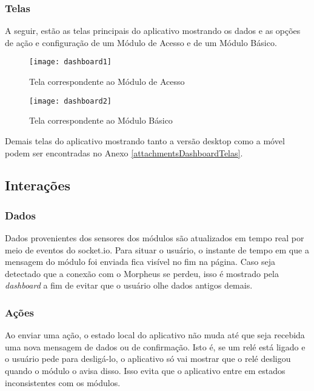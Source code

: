 \subsubsection{Telas}

A seguir, estão as telas principais do aplicativo mostrando os dados e as opções de ação e configuração de um Módulo de Acesso e de um Módulo Básico.

\begin{figure}[H]
	\centering
	\caption{Tela correspondente ao Módulo de Acesso}
  \texttt{[image: dashboard1]}
\label{fig:dashboard1}
\end{figure}

\begin{figure}[H]
	\centering
	\caption{Tela correspondente ao Módulo Básico}
  \texttt{[image: dashboard2]}
\label{fig:dashboard2}
\end{figure}

Demais telas do aplicativo mostrando tanto a versão desktop como a móvel podem ser encontradas no Anexo \ref{attachmentsDashboardTelas}.

\subsection{Interações}

\subsubsection{Dados}

Dados provenientes dos sensores dos módulos são atualizados em tempo real por meio de eventos do socket.io. Para situar o usuário, o instante de tempo em que a mensagem do módulo foi enviada fica visível no fim na página. Caso seja detectado que a conexão com o Morpheus se perdeu, isso é mostrado pela \textit{dashboard} a fim de evitar que o usuário olhe dados antigos demais.

\subsubsection{Ações}

Ao enviar uma ação, o estado local do aplicativo não muda até que seja recebida uma nova mensagem de dados ou de confirmação. Isto é, se um relé está ligado e o usuário pede para desligá-lo, o aplicativo só vai mostrar que o relé desligou quando o módulo o avisa disso. Isso evita que o aplicativo entre em estados inconsistentes com os módulos.

